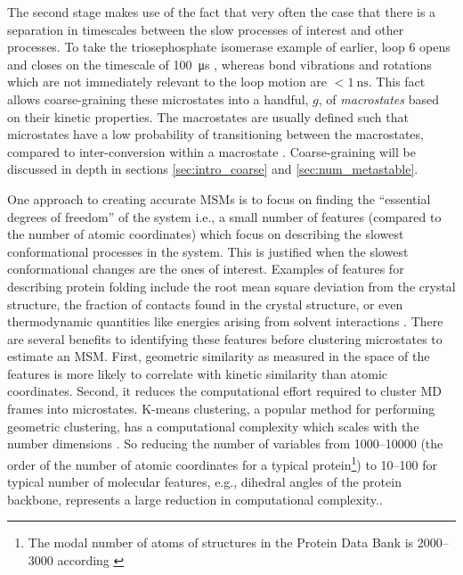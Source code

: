 The second stage makes use of the fact that very often the case that there is a separation in timescales between the slow processes of interest and other processes. To take the triosephosphate isomerase example of earlier, loop 6 opens and closes on the timescale of \SI{100}{\micro\second} \cite{LoopMotionTriosephosphate}, whereas bond vibrations and rotations which are not immediately relevant to the loop motion are $<\SI{1}{\nano\second}$. This fact allows coarse-graining these microstates into a handful, $g$, of \emph{macrostates} based on their kinetic properties. The macrostates are usually defined such that microstates have a low probability of transitioning between the macrostates, compared to inter-conversion within a macrostate \cite{schutteDirectApproachConformational1999,swopeDescribingProteinFolding2004, prinzMarkovModelsMolecular2011}. Coarse-graining will be discussed in depth in sections \ref{sec:intro_coarse} and \ref{sec:num_metastable}. 


One approach to creating accurate MSMs is to focus on finding the ``essential degrees of freedom'' of the system \cite{zwanzigClassicalDynamicsContinuous1983a, schutteDirectApproachConformational1999} i.e., a small number of features  (compared to the number of atomic coordinates)  which focus on describing the slowest conformational processes in the system. This is justified when the slowest conformational changes are the ones of interest. Examples of features for describing protein folding include the root mean square deviation from the crystal structure, the fraction of contacts found in the crystal structure, or even thermodynamic quantities like energies arising from solvent interactions \cite{chongExaminingThermodynamicOrder2018}. There are several benefits to identifying these features before clustering microstates to estimate an MSM. First, geometric similarity as measured in the space of the features is more likely to correlate with kinetic similarity than atomic coordinates.  Second, it reduces the computational effort required to cluster MD frames into microstates. K-means clustering, a popular method for performing geometric clustering, has a computational complexity which scales with the number dimensions \cite{celebiComparativeStudyEfficient2013}. So reducing the number of variables from \numrange{1000}{10000} (the order of the number of atomic coordinates for a typical protein\footnote{The modal number of atoms of structures in the Protein Data Bank is \numrange{2000}{3000} according \cite{bankPDBStatisticsPDB}}) to \numrange{10}{100} for typical number of molecular features, e.g., dihedral angles of the protein backbone, represents a large reduction in computational complexity.. 


